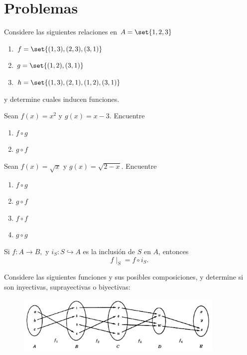 \section*{Problemas}

\begin{problema}
	Considere las siguientes relaciones en $A=\set{1,2,3}$
	\begin{enumerate}
		\item $f=\set{(1,3),(2,3),(3,1)}$
		\item $g=\set{(1,2), (3,1)}$
		\item $h=\set{(1,3),(2,1),(1,2),(3,1)}$
	\end{enumerate}
	y determine cuales inducen funciones.
\end{problema}



\begin{problema}
	Sean $f(x)=x^{2}$ y $g(x)=x-3.$ Encuentre 
	\begin{enumerate}
		\item $f\circ g$ 
		\item $g\circ f$
	\end{enumerate}
\end{problema}




\begin{problema}
	Sean $f(x)=\sqrt{x}$ y $g(x)=\sqrt{2-x}.$ Encuentre 
	\begin{enumerate}
		\item $f\circ g$ 
		\item $g\circ f$ 
		\item $f\circ f$ 
		\item $g\circ g$
	\end{enumerate}
	
\end{problema}


 
 \begin{problema}
  Si $f:A \to B,$ y $i_{S}:S\hookrightarrow A$ es la inclusión de $S$ en $A$, entonces
  $$
  f\mid_{S}= f\circ i_{S}.
  $$
 \end{problema}
 



\begin{problema}
	Considere las siguientes funciones y sus posibles composiciones, y determine si son inyectivas, suprayectivas o biyectivas:
	
	\begin{figure}[h!]
		\centering
		\includegraphics[width=10cm,keepaspectratio=true]{./md/MD02_IM01.png}
		\label{fig:MD0201}
	\end{figure}
	
\end{problema}

